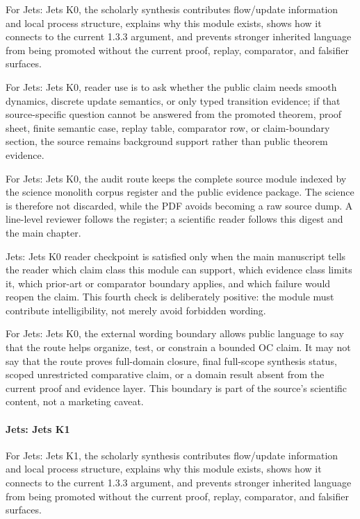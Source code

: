 For Jets: Jets K0, the scholarly synthesis contributes flow/update information and local process structure, explains why this module exists, shows how it connects to the current 1.3.3 argument, and prevents stronger inherited language from being promoted without the current proof, replay, comparator, and falsifier surfaces.


For Jets: Jets K0, reader use is to ask whether the public claim needs smooth dynamics, discrete update semantics, or only typed transition evidence; if that source-specific question cannot be answered from the promoted theorem, proof sheet, finite semantic case, replay table, comparator row, or claim-boundary section, the source remains background support rather than public theorem evidence.


For Jets: Jets K0, the audit route keeps the complete source module indexed by the science monolith corpus register and the public evidence package. The science is therefore not discarded, while the PDF avoids becoming a raw source dump. A line-level reviewer follows the register; a scientific reader follows this digest and the main chapter.


Jets: Jets K0 reader checkpoint is satisfied only when the main manuscript tells the reader which claim class this module can support, which evidence class limits it, which prior-art or comparator boundary applies, and which failure would reopen the claim. This fourth check is deliberately positive: the module must contribute intelligibility, not merely avoid forbidden wording.


For Jets: Jets K0, the external wording boundary allows public language to say that the route helps organize, test, or constrain a bounded OC claim. It may not say that the route proves full-domain closure, final full-scope synthesis status, scoped unrestricted comparative claim, or a domain result absent from the current proof and evidence layer. This boundary is part of the source's scientific content, not a marketing caveat.


\paragraph{Jets: Jets K1}

For Jets: Jets K1, the scholarly synthesis contributes flow/update information and local process structure, explains why this module exists, shows how it connects to the current 1.3.3 argument, and prevents stronger inherited language from being promoted without the current proof, replay, comparator, and falsifier surfaces.


